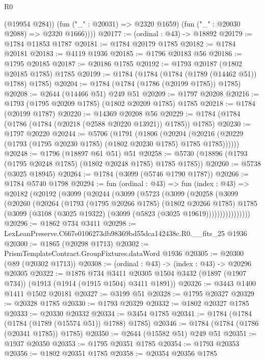 \begin{lexlean}{R0}
\begin{coremodule}
            (@19954 @284))
          (fun ("_" : @20031) => @2320 @1659)
          (fun ("_" : @20030 @2088) => @2320 @1666))))
@20177 := (ordinal : @43) -> @18892
@20179 := @1784 @11853 @1787
@20181 := @1784 @20179 @1785
@20182 := @1784 @20181
@20183 := @4119 @1936
@20185 := @1796 @20183 @56
@20186 := @1795 @20185
@20187 := @20186 @1785
@20192 := @1793 @20187 (@1802 @20185 @1785) @1785
@20199 := @1784 (@1784 (@1784 (@1789 (@14462 @51)) @1788) @1785)
@20204 := @1784 (@1784 (@1786 (@20199 @1785)) @1785)
@20208 := @2644 (@14466 @51) @249 @51
@20209 := @1797 @20208
@20216 := @1793 (@1795 @20209 @1785) (@1802 @20209 @1785) @1785
@20218 := @1784 (@20199 @1787)
@20220 := @14369 @20208 @56
@20229 := @1784 (@1784 (@1786 (@1784 (@20218 (@2588 @20220 @13921)) @1785)) @1785)
@20230 := @1797 @20220
@20244 := @5706
    (@1791
      (@1806
        (@20204 (@20216 (@20229 (@1793 (@1795 @20230 @1785) (@1802 @20230 @1785) @1785 @1785))))))
@20248 := @1796 (@18897 @61 @51) @51
@20258 := @5730 (@18896 (@1793 (@1795 @20248 @1785) (@1802 @20248 @1785) @1785 @1785))
@20260 := @5738 (@3025 @18945)
@20264 := @1784 (@3099 (@5746 @1790 @1787))
@20266 := @1784 @5740 @1798
@20294 := fun (ordinal : @43) =>
  fun (index : @43) =>
  @20182
    (@20192
      (@3099
        (@20244
          (@3099
            (@5723
              (@3099
                (@20258
                  (@3099
                    (@20260
                      (@20264
                        (@1793
                          (@1795 @20266 @1785)
                          (@1802 @20266 @1785)
                          @1785
                          (@3099 (@3108 (@3025 @19322) (@3099 (@5823 (@3025 @19619))))))))))))))))
@20296 := @1862 @734 @3411
@20298 := LexLeanPreserve.C667e0106273db98369bd55dca142438c.R0.__fits_25 @1936
@20300 := @1865 (@20298 @1713)
@20302 := PrismTemplateContract.GroupFixtures.dataWord @1936
@20305 := @20300 (@89 (@20302 @1713))
@20308 := (ordinal : @43) -> (index : @43) -> @20296 @20305
@20322 := @1876
    @734
    @3411
    @20305
    @1504
    @3432
    (@1897 (@1907 @734))
    (@1913 (@1914 (@1915 @1504) @3411 @1891))
@20326 := @3443 @1400 @1411 @1502 @20181
@20327 := @3199 @51
@20328 := @1795 @20327
@20329 := @20328 @1785
@20330 := @1793 @20329
@20332 := @1802 @20327 @1785
@20333 := @20330 @20332
@20334 := @3454 @1785
@20341 := @1784 (@1784 (@1784 (@1789 (@15574 @51)) @1788) @1785)
@20346 := @1784 (@1784 (@1786 (@20341 @1785)) @1785)
@20350 := @2644 (@15582 @51) @249 @51
@20351 := @1937 @20350
@20353 := @1795 @20351 @1785
@20354 := @1793 @20353
@20356 := @1802 @20351 @1785
@20358 := @20354 @20356 @1785

\end{coremodule}
\end{lexlean}
